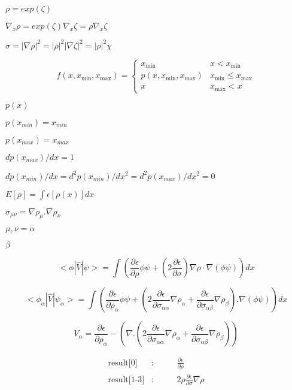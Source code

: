\documentclass{article}
\begin{document}
$ \rho = exp(\zeta) $
\pagebreak

$ \nabla_x\rho = exp(\zeta)\nabla_x\zeta = \rho \nabla_x\zeta $
\pagebreak

$ \sigma = |\nabla\rho|^2 = |\rho|^2 |\nabla\zeta|^2 = |\rho|^2 \chi $
\pagebreak

\[ f(x,x_{\mathrm{min}},x_{\mathrm{max}}) = \left\{ \begin{array}{ll} x_{\mathrm{min}} & x < x_{\mathrm{min}} \\ p(x,x_{\mathrm{min}},x_{\mathrm{max}}) & x_{\mathrm{min}} \leq x_{\mathrm{max}} \\ x & x_{\mathrm{max}} < x \end{array} \right. \]
\pagebreak

$p(x)$
\pagebreak

$p(x_{min})=x_{min}$
\pagebreak

$p(x_{max})=x_{max}$
\pagebreak

$dp(x_{max})/dx=1$
\pagebreak

$dp(x_{min})/dx=d^2p(x_{min})/dx^2=d^2p(x_{max})/dx^2=0$
\pagebreak

$ E[\rho] = \int \epsilon[\rho(x)] dx$
\pagebreak

$ \sigma_{\mu \nu} = \nabla \rho_{\mu} . \nabla \rho_{\nu} $
\pagebreak

$ \mu, \nu = \alpha$
\pagebreak

$ \beta $
\pagebreak

\[ < \phi | \hat V | \psi > = \int \left( \frac{\partial \epsilon}{\partial \rho} \phi \psi + \left( 2 \frac{\partial \epsilon}{\partial \sigma} \right) \nabla \rho \cdot \nabla \left( \phi \psi \right) \right) dx \]
\pagebreak

\[ < \phi_{\alpha} | \hat V | \psi_{\alpha} > = \int \left( \frac{\partial \epsilon}{\partial \rho_{\alpha}} \phi \psi + \left( 2 \frac{\partial \epsilon}{\partial \sigma_{\alpha \alpha}} \nabla \rho_{\alpha} + \frac{\partial \epsilon}{\partial \sigma_{\alpha \beta}} \nabla \rho_{\beta} \right) . \nabla \left( \phi \psi \right) \right) dx \]
\pagebreak

\[ V_{\alpha} = \frac{\partial \epsilon}{\partial \rho_{\alpha}} - \left(\nabla . \left(2 \frac{\partial \epsilon}{\partial \sigma_{\alpha \alpha}} \nabla \rho_{\alpha} + \frac{\partial \epsilon}{\partial \sigma_{\alpha \beta}} \nabla \rho_{\beta} \right) \right) \]
\pagebreak

\begin{eqnarray*} \mbox{result[0]} &:& \qquad \frac{\partial \epsilon}{\partial \rho} \\ \mbox{result[1-3]} &:& \qquad 2 \rho \frac{\partial \epsilon}{\partial \sigma} \nabla\rho \end{eqnarray*}
\pagebreak
\end{document}
